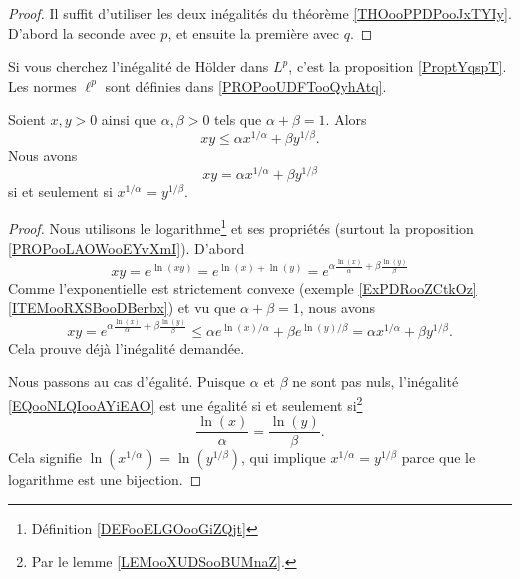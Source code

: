 \begin{proof}
	Il suffit d'utiliser les deux inégalités du théorème \ref{THOooPPDPooJxTYIy}. D'abord la seconde avec \( p\), et ensuite la première avec \( q\).
\end{proof}


Si vous cherchez l'inégalité de Hölder dans \( L^p\), c'est la proposition \ref{ProptYqspT}. Les normes \(  \ell^p\) sont définies dans \ref{PROPooUDFTooQyhAtq}.

\begin{lemma}     \label{LEMooLGGDooGLGFHj}
	Soient \( x,y>0\) ainsi que \( \alpha,\beta>0\) tels que \( \alpha+\beta=1\). Alors
	\begin{equation}
		xy\leq \alpha x^{1/\alpha}+\beta y^{1/\beta}.
	\end{equation}
	Nous avons
	\begin{equation}
		xy= \alpha x^{1/\alpha}+\beta y^{1/\beta}
	\end{equation}
	si et seulement si \( x^{1/\alpha}=y^{1/\beta}\).
\end{lemma}

\begin{proof}
	Nous utilisons le logarithme\footnote{Définition \ref{DEFooELGOooGiZQjt}} et ses propriétés (surtout la proposition \ref{PROPooLAOWooEYvXmI}). D'abord
	\begin{equation}
		xy= e^{\ln(xy)}= e^{\ln(x)+\ln(y)}= e^{\alpha\frac{ \ln(x) }{ \alpha }+\beta\frac{ \ln(y) }{ \beta }}
	\end{equation}
	Comme l'exponentielle est strictement convexe (exemple \ref{ExPDRooZCtkOz}\ref{ITEMooRXSBooDBerbx}) et vu que \( \alpha+\beta=1\), nous avons
	\begin{equation}        \label{EQooNLQIooAYiEAO}
		xy= e^{\alpha\frac{ \ln(x) }{ \alpha }+\beta\frac{ \ln(y) }{ \beta }}\leq \alpha e^{\ln(x)/\alpha}+\beta e^{\ln(y)/\beta}=\alpha x^{1/\alpha}+\beta y^{1/\beta}.
	\end{equation}
	Cela prouve déjà l'inégalité demandée.

	Nous passons au cas d'égalité. Puisque \( \alpha\) et \( \beta\) ne sont pas nuls, l'inégalité \eqref{EQooNLQIooAYiEAO} est une égalité si et seulement si\footnote{Par le lemme \ref{LEMooXUDSooBUMnaZ}.}
	\begin{equation}
		\frac{ \ln(x) }{ \alpha }=\frac{ \ln(y) }{ \beta }.
	\end{equation}
	Cela signifie \( \ln(x^{1/\alpha})=\ln(y^{1/\beta})\), qui implique \( x^{1/\alpha}=y^{1/\beta}\) parce que le logarithme est une bijection.
\end{proof}

